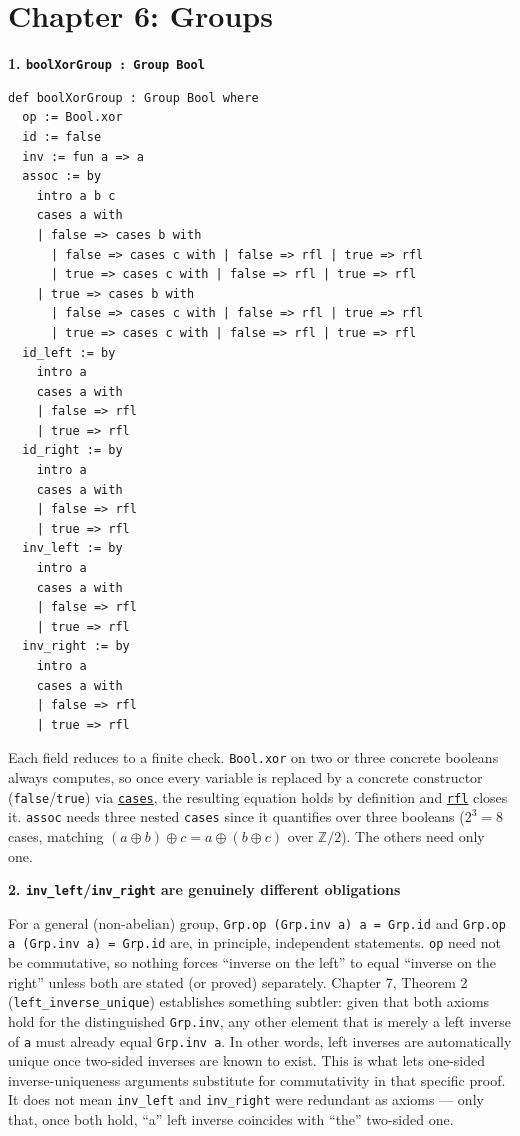 \section{Chapter 6: Groups}\label{sec:14-appendix-solutions:05-chapter-6:1}

\textbf{1. \texttt{boolXorGroup : Group Bool}}

\begin{lstlisting}
def boolXorGroup : Group Bool where
  op := Bool.xor
  id := false
  inv := fun a => a
  assoc := by
    intro a b c
    cases a with
    | false => cases b with
      | false => cases c with | false => rfl | true => rfl
      | true => cases c with | false => rfl | true => rfl
    | true => cases b with
      | false => cases c with | false => rfl | true => rfl
      | true => cases c with | false => rfl | true => rfl
  id_left := by
    intro a
    cases a with
    | false => rfl
    | true => rfl
  id_right := by
    intro a
    cases a with
    | false => rfl
    | true => rfl
  inv_left := by
    intro a
    cases a with
    | false => rfl
    | true => rfl
  inv_right := by
    intro a
    cases a with
    | false => rfl
    | true => rfl
\end{lstlisting}

Each field reduces to a finite check. \texttt{Bool.xor} on two or three concrete booleans always computes, so once every variable is replaced by a concrete constructor (\texttt{false}/\texttt{true}) via \href{https://lean-lang.org/doc/reference/latest/Tactic-Proofs/Tactic-Reference/}{\texttt{cases}}, the resulting equation holds by definition and \href{https://lean-lang.org/doc/reference/latest/Tactic-Proofs/Tactic-Reference/}{\texttt{rfl}} closes it. \texttt{assoc} needs three nested \texttt{cases} since it quantifies over three booleans (\(2^3 = 8\) cases, matching \((a \oplus b) \oplus c = a \oplus (b \oplus c)\) over \(\mathbb{Z}/2\)). The others need only one.

\textbf{2. \texttt{inv\_left}/\texttt{inv\_right} are genuinely different obligations}

For a general (non-abelian) group, \texttt{Grp.op (Grp.inv a) a = Grp.id} and \texttt{Grp.op a (Grp.inv a) = Grp.id} are, in principle, independent statements. \texttt{op} need not be commutative, so nothing forces ``inverse on the left'' to equal ``inverse on the right'' unless both are stated (or proved) separately. Chapter 7, Theorem 2 (\texttt{left\_inverse\_unique}) establishes something subtler: given that both axioms hold for the distinguished \texttt{Grp.inv}, any other element that is merely a left inverse of \texttt{a} must already equal \texttt{Grp.inv a}. In other words, left inverses are automatically unique once two-sided inverses are known to exist. This is what lets one-sided inverse-uniqueness arguments substitute for commutativity in that specific proof. It does not mean \texttt{inv\_left} and \texttt{inv\_right} were redundant as axioms --- only that, once both hold, ``a'' left inverse coincides with ``the'' two-sided one.
